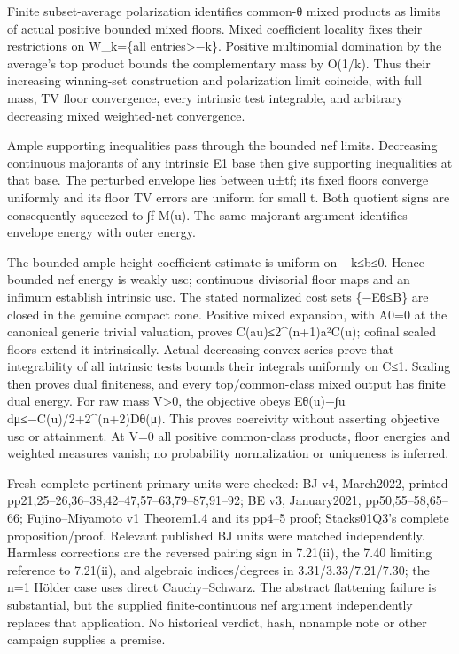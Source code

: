 \documentclass[
  10pt,
]{article}
\begin{document}
Finite subset-average polarization identifies common-θ mixed products as
limits of actual positive bounded mixed floors. Mixed coefficient
locality fixes their restrictions on W\_k=\{all entries\textgreater−k\}.
Positive multinomial domination by the average's top product bounds the
complementary mass by O(1/k). Thus their increasing winning-set
construction and polarization limit coincide, with full mass, TV floor
convergence, every intrinsic test integrable, and arbitrary decreasing
mixed weighted-net convergence.

Ample supporting inequalities pass through the bounded nef limits.
Decreasing continuous majorants of any intrinsic E1 base then give
supporting inequalities at that base. The perturbed envelope lies
between u±\textbar t\textbar\textbar\textbar f\textbar\textbar; its
fixed floors converge uniformly and its floor TV errors are uniform for
small t. Both quotient signs are consequently squeezed to ∫f M(u). The
same majorant argument identifies envelope energy with outer energy.

The bounded ample-height coefficient estimate is uniform on −k≤b≤0.
Hence bounded nef energy is weakly usc; continuous divisorial floor maps
and an infimum establish intrinsic usc. The stated normalized cost sets
\{−Eθ≤B\} are closed in the genuine compact cone. Positive mixed
expansion, with A0=0 at the canonical generic trivial valuation, proves
C(au)≤2\^{}(n+1)a²C(u); cofinal scaled floors extend it intrinsically.
Actual decreasing convex series prove that integrability of all
intrinsic tests bounds their integrals uniformly on C≤1. Scaling then
proves dual finiteness, and every top/common-class mixed output has
finite dual energy. For raw mass V\textgreater0, the objective obeys
Eθ(u)−∫u dμ≤−C(u)/2+2\^{}(n+2)Dθ(μ). This proves coercivity without
asserting objective usc or attainment. At V=0 all positive common-class
products, floor energies and weighted measures vanish; no probability
normalization or uniqueness is inferred.

Fresh complete pertinent primary units were checked: BJ v4, March2022,
printed pp21,25--26,36--38,42--47,57--63,79--87,91--92; BE v3,
January2021, pp50,55--58,65--66; Fujino--Miyamoto v1 Theorem1.4 and its
pp4--5 proof; Stacks01Q3's complete proposition/proof. Relevant
published BJ units were matched independently. Harmless corrections are
the reversed pairing sign in 7.21(ii), the 7.40 limiting reference to
7.21(ii), and algebraic indices/degrees in 3.31/3.33/7.21/7.30; the n=1
Hölder case uses direct Cauchy--Schwarz. The abstract flattening failure
is substantial, but the supplied finite-continuous nef argument
independently replaces that application. No historical verdict, hash,
nonample note or other campaign supplies a premise.
\end{document}
